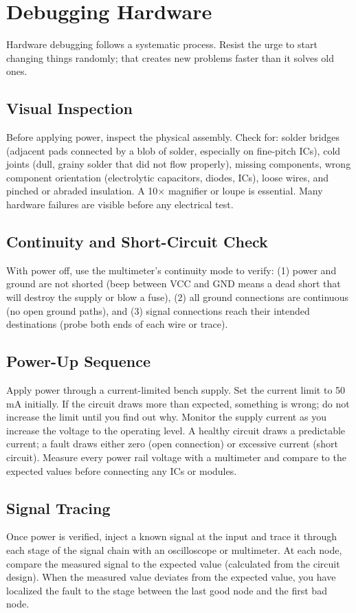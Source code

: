 \documentclass[11pt,letterpaper,twoside,openany]{book}
\begin{document}
\section{Debugging Hardware}

Hardware debugging follows a systematic process. Resist the urge to start changing things randomly; that creates new problems faster than it solves old ones.

\subsection{Visual Inspection}
Before applying power, inspect the physical assembly. Check for: solder bridges (adjacent pads connected by a blob of solder, especially on fine-pitch ICs), cold joints (dull, grainy solder that did not flow properly), missing components, wrong component orientation (electrolytic capacitors, diodes, ICs), loose wires, and pinched or abraded insulation. A 10$\times$ magnifier or loupe is essential. Many hardware failures are visible before any electrical test.

\subsection{Continuity and Short-Circuit Check}
With power off, use the multimeter's continuity mode to verify: (1) power and ground are not shorted (beep between VCC and GND means a dead short that will destroy the supply or blow a fuse), (2) all ground connections are continuous (no open ground paths), and (3) signal connections reach their intended destinations (probe both ends of each wire or trace).

\subsection{Power-Up Sequence}
Apply power through a current-limited bench supply. Set the current limit to 50\,mA initially. If the circuit draws more than expected, something is wrong; do not increase the limit until you find out why. Monitor the supply current as you increase the voltage to the operating level. A healthy circuit draws a predictable current; a fault draws either zero (open connection) or excessive current (short circuit). Measure every power rail voltage with a multimeter and compare to the expected values before connecting any ICs or modules.

\subsection{Signal Tracing}
Once power is verified, inject a known signal at the input and trace it through each stage of the signal chain with an oscilloscope or multimeter. At each node, compare the measured signal to the expected value (calculated from the circuit design). When the measured value deviates from the expected value, you have localized the fault to the stage between the last good node and the first bad node.
\end{document}
